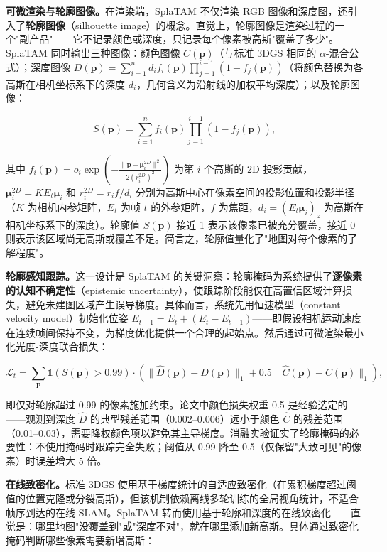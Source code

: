 \textbf{可微渲染与轮廓图像。}在渲染端，SplaTAM 不仅渲染 RGB 图像和深度图，还引入了\textbf{轮廓图像}（silhouette image）的概念。直觉上，轮廓图像是渲染过程的一个"副产品"——它不记录颜色或深度，只记录每个像素被高斯"覆盖了多少"。SplaTAM 同时输出三种图像：颜色图像 $C(\mathbf{p})$（与标准 3DGS 相同的 $\alpha$-混合公式）；深度图像 $D(\mathbf{p}) = \sum_{i=1}^{n} d_i f_i(\mathbf{p}) \prod_{j=1}^{i-1}(1 - f_j(\mathbf{p}))$（将颜色替换为各高斯在相机坐标系下的深度 $d_i$，几何含义为沿射线的加权平均深度）；以及轮廓图像：

\begin{equation*}
S(\mathbf{p}) = \sum_{i=1}^{n} f_i(\mathbf{p}) \prod_{j=1}^{i-1}(1 - f_j(\mathbf{p})),
\end{equation*}

其中 $f_i(\mathbf{p}) = o_i \exp\left(-\frac{\|\mathbf{p} - \boldsymbol{\mu}_i^{2D}\|^2}{2(r_i^{2D})^2}\right)$ 为第 $i$ 个高斯的 2D 投影贡献，$\boldsymbol{\mu}_i^{2D} = K E_t \boldsymbol{\mu}_i$ 和 $r_i^{2D} = r_i f / d_i$ 分别为高斯中心在像素空间的投影位置和投影半径（$K$ 为相机内参矩阵，$E_t$ 为帧 $t$ 的外参矩阵，$f$ 为焦距，$d_i = (E_t \boldsymbol{\mu}_i)_z$ 为高斯在相机坐标系下的深度）。轮廓值 $S(\mathbf{p})$ 接近 1 表示该像素已被充分覆盖，接近 0 则表示该区域尚无高斯或覆盖不足。简言之，轮廓值量化了"地图对每个像素的了解程度"。

\textbf{轮廓感知跟踪。}这一设计是 SplaTAM 的关键洞察：轮廓掩码为系统提供了\textbf{逐像素的认知不确定性}（epistemic uncertainty），使跟踪阶段能仅在高置信区域计算损失，避免未建图区域产生误导梯度。具体而言，系统先用恒速模型（constant velocity model）初始化位姿 $E_{t+1} = E_t + (E_t - E_{t-1})$——即假设相机运动速度在连续帧间保持不变，为梯度优化提供一个合理的起始点。然后通过可微渲染最小化光度-深度联合损失：

\begin{equation*}
\mathcal{L}_t = \sum_{\mathbf{p}} \mathbb{1}(S(\mathbf{p}) > 0.99) \cdot \left(\|\hat{D}(\mathbf{p}) - D(\mathbf{p})\|_1 + 0.5 \|\hat{C}(\mathbf{p}) - C(\mathbf{p})\|_1\right),
\end{equation*}

即仅对轮廓超过 0.99 的像素施加约束。论文中颜色损失权重 0.5 是经验选定的——观测到深度 $\hat{D}$ 的典型残差范围（0.002--0.006）远小于颜色 $\hat{C}$ 的残差范围（0.01--0.03），需要降权颜色项以避免其主导梯度。消融实验证实了轮廓掩码的必要性：不使用掩码时跟踪完全失败；阈值从 0.99 降至 0.5（仅保留"大致可见"的像素）时误差增大 5 倍。

\textbf{在线致密化。}标准 3DGS 使用基于梯度统计的自适应致密化（在累积梯度超过阈值的位置克隆或分裂高斯），但该机制依赖离线多轮训练的全局视角统计，不适合帧序到达的在线 SLAM。SplaTAM 转而使用基于轮廓和深度的在线致密化——直觉是：哪里地图"没覆盖到"或"深度不对"，就在哪里添加新高斯。具体通过致密化掩码判断哪些像素需要新增高斯：

